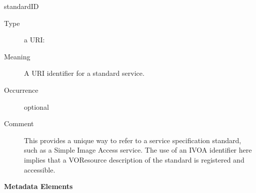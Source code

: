 \documentclass[11pt,a4paper]{ivoa}
\begin{document}
\begingroup\small\begin{bigdescription}
\item[standardID]
\begin{description}
\item[Type] a URI: 
\item[Meaning] 
               A URI identifier for a standard service. 
            
\item[Occurrence] optional
\item[Comment] 
               This provides a unique way to refer to a service
               specification standard, such as a Simple Image Access service.
               The use of an IVOA identifier here implies that a
               VOResource description of the standard is registered and 
               accessible.  
            
\end{description}


\end{bigdescription}\endgroup



\vspace{0.5ex}\noindent\textbf{ Metadata Elements}
\end{document}
